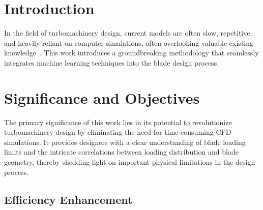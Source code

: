 \documentclass[11pt,a4paper,twocolumn]{article}
\begin{document}



\section{Introduction}
\label{sec:introduction}

In the field of turbomachinery design, current models are often slow, repetitive, and heavily reliant on computer simulations, often overlooking valuable existing knowledge~\cite{clark2019step}. This work introduces a groundbreaking methodology that seamlessly integrates machine learning techniques into the blade design process.

\section{Significance and Objectives}
\label{sec:objectives}

The primary significance of this work lies in its potential to revolutionize turbomachinery design by eliminating the need for time-consuming CFD simulations. It provides designers with a clear understanding of blade loading limits and the intricate correlations between loading distribution and blade geometry, thereby shedding light on important physical limitations in the design process.

\subsection{Efficiency Enhancement}
\end{document}
